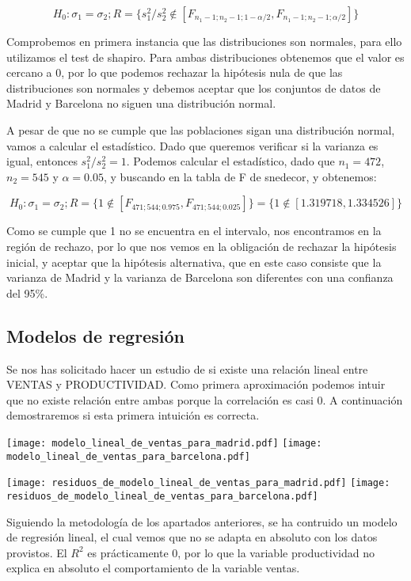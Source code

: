 \documentclass{article}
\begin{document}
\[H_0:\sigma{}_1 = \sigma{}_2; R=\{s^2_1/s^2_2\not\in[F_{n_1-1;n_2-1;1-\alpha/2}, F_{n_1-1;n_2-1;\alpha/2}]\}\]

Comprobemos en primera instancia que las distribuciones son normales, para ello utilizamos el test de shapiro. Para ambas distribuciones obtenemos que el valor es cercano a 0, por lo que podemos rechazar la hipótesis nula de que las distribuciones son normales y debemos aceptar que los conjuntos de datos de Madrid y Barcelona no siguen una distribución normal.

A pesar de que no se cumple que las poblaciones sigan una distribución normal, vamos a calcular el estadístico. Dado que queremos verificar si la varianza es igual, entonces $s^2_1/s^2_2=1$. Podemos calcular el estadístico, dado que $n_1=472$, $n_2=545$ y $\alpha = 0.05$, y buscando en la tabla de F de snedecor, y obtenemos:

\[H_0:\sigma{}_1 = \sigma{}_2; R=\{1\not\in[F_{471;544;0.975}, F_{471;544;0.025}]\}=\{1\not\in[1.319718,1.334526]\}\]

Como se cumple que 1 no se encuentra en el intervalo, nos encontramos en la región de rechazo, por lo que nos vemos en la obligación de rechazar la hipótesis inicial, y aceptar que la hipótesis alternativa, que en este caso consiste que la varianza de Madrid y la varianza de Barcelona son diferentes con una confianza del 95\%.

\subsection{Modelos de regresión}

Se nos has solicitado hacer un estudio de si existe una relación lineal entre VENTAS y PRODUCTIVIDAD. Como primera aproximación podemos intuir que no existe relación entre ambas porque la correlación es casi 0. A continuación demostraremos si esta primera intuición es correcta.

\texttt{[image: modelo\_lineal\_de\_ventas\_para\_madrid.pdf]}
\texttt{[image: modelo\_lineal\_de\_ventas\_para\_barcelona.pdf]}
\FloatBarrier

\texttt{[image: residuos\_de\_modelo\_lineal\_de\_ventas\_para\_madrid.pdf]}
\texttt{[image: residuos\_de\_modelo\_lineal\_de\_ventas\_para\_barcelona.pdf]}
\FloatBarrier


\FloatBarrier

Siguiendo la metodología de los apartados anteriores, se ha contruido un modelo de regresión lineal, el cual vemos que no se adapta en absoluto con los datos provistos. El $R^2$ es prácticamente 0, por lo que la variable productividad no explica en absoluto el comportamiento de la variable ventas.
\end{document}
